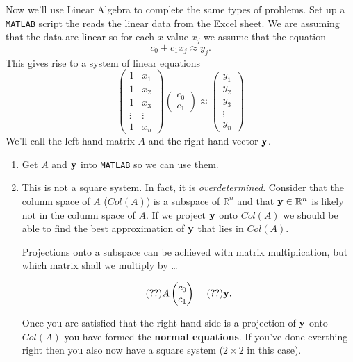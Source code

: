 \begin{problem}
    Now we'll use Linear Algebra to complete the same types of problems.  Set up a
    \texttt{MATLAB} script the reads the linear data from the Excel sheet.  We are
    assuming that the data are linear so for each $x$-value $x_j$ we assume that the equation 
    \[ c_0 + c_1 x_j \approx y_j. \]
    This gives rise to a system of linear equations
    \[ \begin{pmatrix} 1 & x_1 \\ 1 & x_2 \\ 1 & x_3 \\ \vdots & \vdots \\ 1 & x_n
        \end{pmatrix} \begin{pmatrix} c_0 \\ c_1 \end{pmatrix} \approx \begin{pmatrix} y_1
            \\ y_2 \\ y_3 \\ \vdots \\ y_n \end{pmatrix} \]
    We'll call the left-hand matrix $A$ and the right-hand vector ${\bf y}$.  
    \begin{enumerate}
        \item Get $A$ and ${\bf y}$ into \texttt{MATLAB} so we can use them.
        \item This is not a square system. In fact, it is {\it overdetermined}.  Consider
            that the column space of $A$ ($Col(A)$) is a subspace of $\mathbb{R}^n$ and
            that ${\bf y} \in \mathbb{R}^n$ is likely not in the column space of $A$.  If we
            project ${\bf y}$ onto $Col(A)$ we should be able to find the best approximation
            of ${\bf y}$ that lies in $Col(A)$. 

            Projections onto a subspace can be achieved with matrix multiplication, but
            which matrix shall we multiply by \dots

            \[ (??) A \begin{pmatrix} c_0 \\ c_1 \end{pmatrix}  = (??) {\bf y}. \]

            Once you are satisfied that the right-hand side is a projection of ${\bf y}$ onto
            $Col(A)$ you have formed the {\bf normal equations}.  If you've done everthing
            right then you also now have a square system ($2 \times 2$ in this case).


\end{enumerate}
\end{problem}
